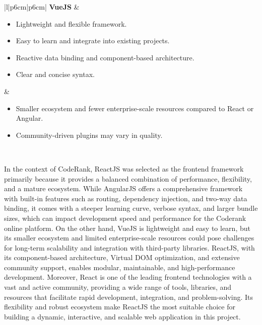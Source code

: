 \begin{longtable}{|l|p{6cm}|p{6cm}|}
\textbf{VueJS} &
\begin{minipage}[t]{\linewidth}
\begin{itemize}[leftmargin=*,noitemsep,nolistsep]
    \item Lightweight and flexible framework.
    \item Easy to learn and integrate into existing projects.
    \item Reactive data binding and component-based architecture.
    \item Clear and concise syntax.
\end{itemize}
\end{minipage} &
\begin{minipage}[t]{\linewidth}
\begin{itemize}[leftmargin=*,noitemsep,nolistsep]
    \item Smaller ecosystem and fewer enterprise-scale resources compared to React or Angular.
    \item Community-driven plugins may vary in quality.
\end{itemize}
\end{minipage} \\
\hline

\end{longtable}

\FloatBarrier

In the context of CodeRank, ReactJS was selected as the frontend framework primarily because it provides a balanced combination of performance, flexibility, and a mature ecosystem. While AngularJS offers a comprehensive framework with built-in features such as routing, dependency injection, and two-way data binding, it comes with a steeper learning curve, verbose syntax, and larger bundle sizes, which can impact development speed and performance for the Coderank online platform. On the other hand, VueJS is lightweight and easy to learn, but its smaller ecosystem and limited enterprise-scale resources could pose challenges for long-term scalability and integration with third-party libraries. ReactJS, with its component-based architecture, Virtual DOM optimization, and extensive community support, enables modular, maintainable, and high-performance development. Moreover, React is one of the leading frontend technologies with a vast and active community, providing a wide range of tools, libraries, and resources that facilitate rapid development, integration, and problem-solving. Its flexibility and robust ecosystem make ReactJS the most suitable choice for building a dynamic, interactive, and scalable web application in this project.

